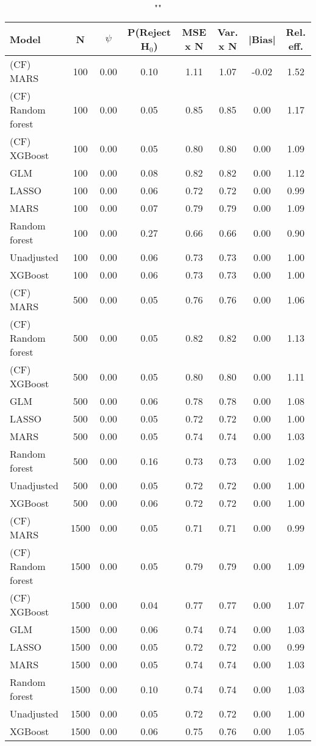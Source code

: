 \begin{table}
\centering
\caption{""}
\begin{tabular}{lccccccc}
\toprule
Model & N & $\psi$ & P(Reject H$_0$) & MSE x N & Var. x N & |Bias| & Rel. eff.\\ \midrule
(CF) MARS & 100 & 0.00 & 0.10 & 1.11 & 1.07 & -0.02 & 1.52 \\ 
(CF) Random forest & 100 & 0.00 & 0.05 & 0.85 & 0.85 &  0.00 & 1.17 \\ 
(CF) XGBoost & 100 & 0.00 & 0.05 & 0.80 & 0.80 &  0.00 & 1.09 \\ 
GLM & 100 & 0.00 & 0.08 & 0.82 & 0.82 &  0.00 & 1.12 \\ 
LASSO & 100 & 0.00 & 0.06 & 0.72 & 0.72 &  0.00 & 0.99 \\ 
MARS & 100 & 0.00 & 0.07 & 0.79 & 0.79 &  0.00 & 1.09 \\ 
Random forest & 100 & 0.00 & 0.27 & 0.66 & 0.66 &  0.00 & 0.90 \\ 
Unadjusted & 100 & 0.00 & 0.06 & 0.73 & 0.73 &  0.00 & 1.00 \\ 
XGBoost & 100 & 0.00 & 0.06 & 0.73 & 0.73 &  0.00 & 1.00 \\ \addlinespace 
(CF) MARS & 500 & 0.00 & 0.05 & 0.76 & 0.76 &  0.00 & 1.06 \\ 
(CF) Random forest & 500 & 0.00 & 0.05 & 0.82 & 0.82 &  0.00 & 1.13 \\ 
(CF) XGBoost & 500 & 0.00 & 0.05 & 0.80 & 0.80 &  0.00 & 1.11 \\ 
GLM & 500 & 0.00 & 0.06 & 0.78 & 0.78 &  0.00 & 1.08 \\ 
LASSO & 500 & 0.00 & 0.05 & 0.72 & 0.72 &  0.00 & 1.00 \\ 
MARS & 500 & 0.00 & 0.05 & 0.74 & 0.74 &  0.00 & 1.03 \\ 
Random forest & 500 & 0.00 & 0.16 & 0.73 & 0.73 &  0.00 & 1.02 \\ 
Unadjusted & 500 & 0.00 & 0.05 & 0.72 & 0.72 &  0.00 & 1.00 \\ 
XGBoost & 500 & 0.00 & 0.06 & 0.72 & 0.72 &  0.00 & 1.00 \\ \addlinespace 
(CF) MARS & 1500 & 0.00 & 0.05 & 0.71 & 0.71 &  0.00 & 0.99 \\ 
(CF) Random forest & 1500 & 0.00 & 0.05 & 0.79 & 0.79 &  0.00 & 1.09 \\ 
(CF) XGBoost & 1500 & 0.00 & 0.04 & 0.77 & 0.77 &  0.00 & 1.07 \\ 
GLM & 1500 & 0.00 & 0.06 & 0.74 & 0.74 &  0.00 & 1.03 \\ 
LASSO & 1500 & 0.00 & 0.05 & 0.72 & 0.72 &  0.00 & 0.99 \\ 
MARS & 1500 & 0.00 & 0.05 & 0.74 & 0.74 &  0.00 & 1.03 \\ 
Random forest & 1500 & 0.00 & 0.10 & 0.74 & 0.74 &  0.00 & 1.03 \\ 
Unadjusted & 1500 & 0.00 & 0.05 & 0.72 & 0.72 &  0.00 & 1.00 \\ 
XGBoost & 1500 & 0.00 & 0.06 & 0.75 & 0.76 &  0.00 & 1.05 \\
\bottomrule
\end{tabular}
\end{table}

